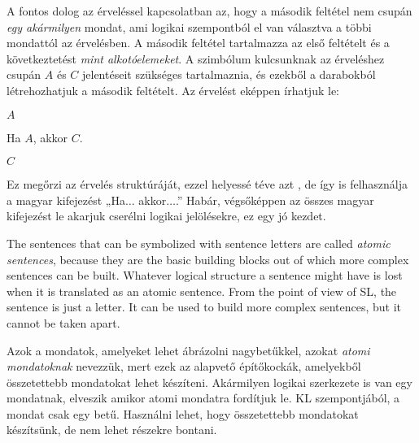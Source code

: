 A fontos dolog az érveléssel kapcsolatban az, hogy a második feltétel nem csupán \emph{egy akármilyen} mondat, ami logikai szempontból el van választva a többi mondattól az érvelésben. A második feltétel tartalmazza az első feltételt és a következtetést \emph{mint alkotóelemeket}. A szimbólum kulcsunknak az érveléshez csupán  $A$ és $C$ jelentéseit szükséges tartalmaznia, és ezekből a darabokból létrehozhatjuk a második feltételt. Az érvelést eképpen írhatjuk le:
\begin{earg}
\item[] $A$
\item[] Ha $A$, akkor $C$.
\item[\therefore] $C$
\end{earg}
Ez megőrzi az érvelés struktúráját, ezzel helyessé téve azt , de így is felhasználja a magyar kifejezést „Ha$\ldots$ akkor$\ldots$.” Habár, végsőképpen az összes magyar kifejezést le akarjuk cserélni logikai jelölésekre, ez egy jó kezdet.

The sentences that can be symbolized with sentence letters are called \emph{atomic sentences}, because they are the basic building blocks out of which more complex sentences can be built. Whatever logical structure a sentence might have is lost when it is translated as an atomic sentence. From the point of view of SL, the sentence is just a letter. It can be used to build more complex sentences, but it cannot be taken apart.

Azok a mondatok, amelyeket lehet ábrázolni nagybetűkkel, azokat \emph{atomi mondatoknak} nevezzük, mert ezek az alapvető építőkockák, amelyekből összetettebb mondatokat lehet készíteni. Akármilyen logikai szerkezete is van egy mondatnak, elveszik amikor atomi mondatra fordítjuk le. KL szempontjából, a mondat csak egy betű. Használni lehet, hogy összetettebb mondatokat készítsünk, de nem lehet részekre bontani.



